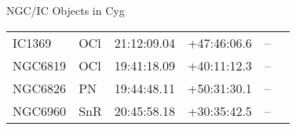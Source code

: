 \begin{block}{NGC/IC Objects in Cyg}
  \centering
  \begin{tabularx}{\textwidth}{llrrll} \toprule 
    IC1369 & OCl & 21:12:09.04 & +47:46:06.6  & -- \\ 
    NGC6819 & OCl & 19:41:18.09 & +40:11:12.3  & -- \\ 
    NGC6826 & PN & 19:44:48.11 & +50:31:30.1  & -- \\ 
    NGC6960 & SnR & 20:45:58.18 & +30:35:42.5  & -- \\ 
  \end{tabularx}
\end{block}